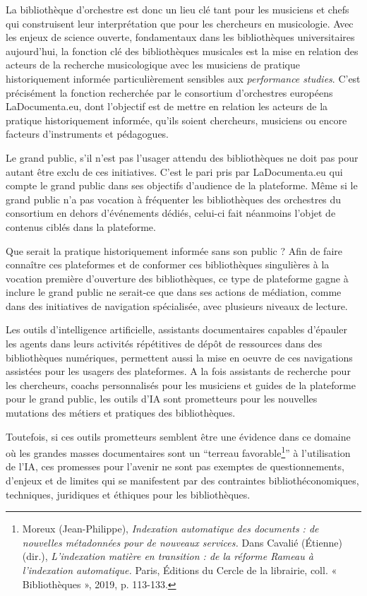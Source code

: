 La bibliothèque d'orchestre est donc un lieu clé tant pour les musiciens et chefs qui construisent leur interprétation que pour les chercheurs en musicologie. Avec les enjeux de science ouverte, fondamentaux dans les bibliothèques universitaires aujourd'hui, la fonction clé des bibliothèques musicales est la mise en relation des acteurs de la recherche musicologique avec les musiciens de pratique historiquement informée particulièrement sensibles aux \textit{performance studies}. C'est précisément la fonction recherchée par le consortium d'orchestres européens LaDocumenta.eu, dont l'objectif est de mettre en relation les acteurs de la pratique historiquement informée, qu'ils soient chercheurs, musiciens ou encore facteurs d'instruments et pédagogues.

Le grand public, s'il n'est pas l'usager attendu des bibliothèques ne doit pas pour autant être exclu de ces initiatives. C'est le pari pris par LaDocumenta.eu qui compte le grand public dans ses objectifs d'audience de la plateforme.  Même si le grand public n'a pas vocation à fréquenter les bibliothèques des orchestres du consortium en dehors d'événements dédiés, celui-ci fait néanmoins l'objet de contenus ciblés dans la plateforme. 

Que serait la pratique historiquement informée sans son public ? Afin de faire connaître ces plateformes et de conformer ces bibliothèques singulières à la vocation première d'ouverture des bibliothèques, ce type de plateforme gagne à inclure le grand public ne serait-ce que dans ses actions de médiation, comme dans des initiatives de navigation spécialisée, avec plusieurs niveaux de lecture. 


Les outils d'intelligence artificielle, assistants documentaires capables d'épauler les agents dans leurs activités répétitives de dépôt de ressources dans des bibliothèques numériques, permettent aussi la mise en oeuvre de ces navigations assistées pour les usagers des plateformes. A la fois assistants de recherche pour les chercheurs, coachs personnalisés pour les musiciens et guides de la plateforme pour le grand public, les outils d'IA sont prometteurs pour les nouvelles mutations des métiers et pratiques des bibliothèques. 


Toutefois, si ces outils prometteurs semblent être une évidence dans ce domaine où les grandes masses documentaires sont un \enquote{terreau favorable\footnote{Moreux (Jean-Philippe), \textit{Indexation automatique des documents : de nouvelles métadonnées pour de nouveaux services.} Dans Cavalié (Étienne) (dir.), \textit{L'indexation matière en transition : de la réforme Rameau à l'indexation automatique.} Paris, Éditions du Cercle de la librairie, coll. « Bibliothèques », 2019, p. 113-133.}} à l'utilisation de l'IA, ces promesses pour l'avenir ne sont pas exemptes de questionnements, d'enjeux et de limites qui se manifestent par des contraintes bibliothéconomiques, techniques, juridiques et éthiques pour les bibliothèques. 


